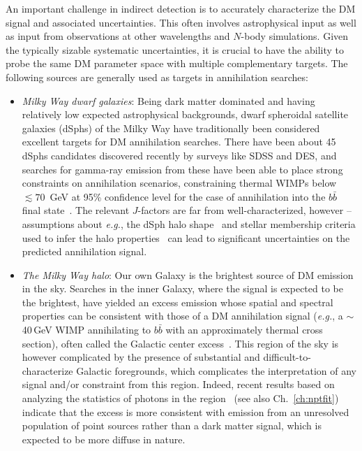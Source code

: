An important challenge in indirect detection is to accurately characterize the DM signal and associated uncertainties. This often involves astrophysical input as well as input from observations at other wavelengths and $N$-body simulations. Given the typically sizable systematic uncertainties, it is crucial to have the ability to probe the same DM parameter space with multiple complementary targets. The following sources are generally used as targets in annihilation searches:  %
\begin{itemize}
\item \emph{Milky Way dwarf galaxies}: Being dark matter dominated and having relatively low expected astrophysical backgrounds, dwarf spheroidal satellite galaxies (dSphs) of the Milky Way have traditionally been considered excellent targets for DM annihilation searches. There have been about 45 dSphs candidates discovered recently by surveys like SDSS and DES, and searches for gamma-ray emission from these have been able to place strong constraints on annihilation scenarios, constraining thermal WIMPs below $\lesssim 70$~GeV at 95\% confidence level for the case of annihilation into  the $b\bar b$ final state~\cite{Fermi-LAT:2016uux,Ackermann:2015zua}. The relevant $J$-factors are far from well-characterized, however -- assumptions about \emph{e.g.}, the dSph halo shape~\cite{Geringer-Sameth:2014qqa,Sanders:2016eie} and stellar membership criteria used to infer the halo properties~\cite{2016MNRAS.462..223B,Geringer-Sameth:2014yza} can lead to significant uncertainties on the predicted annihilation signal.
\item \emph{The Milky Way halo}: Our own Galaxy is the brightest source of DM emission in the sky. Searches in the inner Galaxy, where the signal is expected to be the brightest, have yielded an excess emission whose spatial and spectral properties can be consistent with those of a DM annihilation signal (\emph{e.g.}, a $\sim$40\,GeV WIMP annihilating to $b\bar b$ with an approximately thermal cross section), often called the Galactic center excess~\cite{Daylan:2014rsa,Goodenough:2009gk,Hooper:2010mq,Calore:2014xka,Gordon:2013vta}. This region of the sky is however complicated by the presence of substantial and difficult-to-characterize Galactic foregrounds, which complicates the interpretation of any signal and/or constraint from this region. Indeed, recent results based on analyzing the statistics of photons in the region~\cite{Lee:2015fea,Bartels:2015aea} (see also Ch.~\ref{ch:nptfit}) indicate that the excess is more consistent with emission from an unresolved population of point sources rather than a dark matter signal, which is expected to be more diffuse in nature.


\end{itemize}
